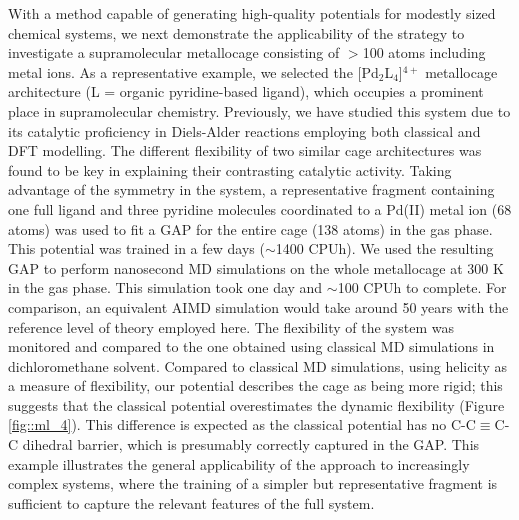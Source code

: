 \documentclass[../../main.tex]{subfiles}
\begin{document}
With a method capable of generating high-quality potentials for modestly sized chemical systems, we next demonstrate the applicability of the strategy to investigate a supramolecular metallocage consisting of $>$100 atoms including metal ions. As a representative example, we selected the [Pd${}_2$L${}_4$]$^{4+}$ metallocage architecture (L = organic pyridine-based ligand), which occupies a prominent place in supramolecular chemistry. Previously, we have studied this system due to its catalytic proficiency in Diels-Alder reactions employing both classical and DFT modelling.\cite{Young2019} The different flexibility of two similar cage architectures was found to be key in explaining their contrasting catalytic activity. 
Taking advantage of the symmetry in the system, a representative fragment containing one full ligand and three pyridine molecules coordinated to a Pd(II) metal ion (68 atoms) was used to fit a GAP for the entire cage (138 atoms) in the gas phase. This potential was trained in a few days ($\sim$1400 CPUh). We used the resulting GAP to perform nanosecond MD simulations on the whole metallocage at 300 K in the gas phase. This simulation took one day and $\sim$100 CPUh to complete. For comparison, an equivalent AIMD simulation would take around 50 years with the reference level of theory employed here. The
flexibility of the system was monitored and compared to the one obtained using classical MD simulations in dichloromethane solvent.\cite{Young2019} Compared to classical MD simulations, using helicity as a measure of flexibility, our potential describes the cage as being more rigid; this suggests that the classical potential overestimates the dynamic flexibility (Figure \ref{fig::ml_4}). This difference is expected as the classical potential has no C-C$\equiv$C-C dihedral barrier, which is presumably correctly captured in the GAP. This example illustrates the general applicability of the approach to increasingly complex systems, where the training of a simpler but representative fragment is sufficient to capture the relevant features of the full system.
\end{document}
